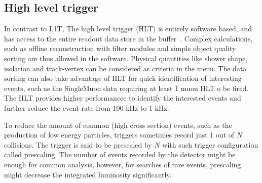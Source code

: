 \subsection{High level trigger}
In contrast to L1T, The high level trigger (HLT) is entirely software based, and has access to the entire readout data store in the buffer~\cite{CMS:HLT}.
Complex calculations, such as offline reconstruction with filter modules and simple object quality sorting are thus allowed in the software.
Physical quantities like shower shape, isolation and track-vertex can be considered as criteria in the menu.
The data sorting can also take advantage of HLT for quick identification of interesting events, such as the SingleMuon data requiring at least 1 muon HLT o be fired.
The HLT provides higher performancce to identify the interested events and further reduce the event rate from 100 kHz to 1 kHz.

To reduce the amount of common (high cross section) events, such as the production of low energy particles, triggers sometimes record just 1 out of $N$ collisions.
The trigger is said to be prescaled by $N$ with such trigger configuration called prescaling.
The number of events recorded by the detector might be enough for common analysis, however, for searches of rare events, prescaling might decrease the integrated luminosity significantly.
